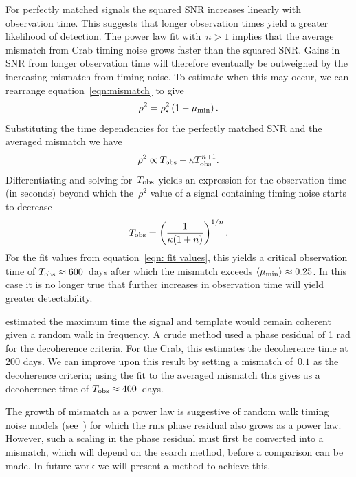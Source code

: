\documentclass[../full_thesis/full_thesis.tex]{subfiles}
\begin{document}
For perfectly matched signals the squared SNR
increases linearly \citep{Prix2009} with observation time.
This suggests that longer observation
times yield a greater likelihood of detection. The power law fit with~$n > 1$
implies that the average mismatch from
Crab timing noise grows faster than the squared SNR.
Gains in
SNR from longer observation time will therefore eventually be
outweighed by the increasing mismatch from timing noise.
To estimate when this may occur, we can rearrange equation~\eqref{eqn:mismatch}
to give
\begin{equation}
    \rho^{2} = \rho^{2}_{\mathrm{s}}\left(1 - \mu_{\mathrm{min}}\right).
\end{equation}
Substituting the time dependencies for the perfectly matched SNR and the
averaged mismatch we have
\begin{equation}
    \rho^{2} \propto T_{\textrm{obs}} - \kappa T_{\textrm{obs}}^{n+1}.
\end{equation}
Differentiating and solving for~$T_{\textrm{obs}}$ yields an expression for the
observation time (in seconds)
beyond which the~$\rho^{2}$ value of a signal containing timing
noise starts to decrease
\begin{equation}
T_{\textrm{obs}} = \left(\frac{1}{\kappa(1+n)}\right)^{1/n}.
\end{equation}
For the fit values from equation~\eqref{eqn: fit values}, this yields
a critical observation time of
$T_{\textrm{obs}}\approx 600$~days after which the mismatch exceeds
$\langle\mu_{\mathrm{min}}\rangle \approx 0.25$.
In this case it is no longer true that further increases in
observation time will yield greater detectability.

\citet{Jones2004} estimated the maximum time the signal and template would
remain coherent given a random walk in  frequency. A crude method used a
phase residual of 1 rad for the decoherence criteria. For the Crab, this
estimates the decoherence time at 200 days. We can improve upon this result by
setting a mismatch of~$0.1$ as the decoherence criteria; using the fit to the
averaged mismatch this gives us a decoherence time of $T_{\textrm{obs}}\approx 400 $~days.

    The growth of mismatch as a power law is suggestive of
random walk timing noise models (see~\citet{Cordes1981})
    for which the rms phase residual also grows as a power law. However,
    such a scaling in the phase residual must first be converted into a mismatch,
    which will depend on the search method, before a comparison can be made. In
    future work we will present a method to achieve this.
\end{document}
